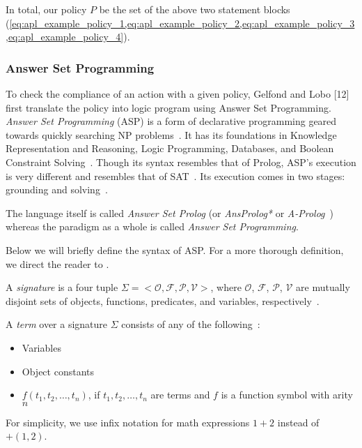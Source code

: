 In total, our policy $P$ be the set of the above two statement blocks (\cref{eq:apl_example_policy_1,eq:apl_example_policy_2,eq:apl_example_policy_3,eq:apl_example_policy_4}).

\subsubsection{Answer Set Programming}
\label{subsubsec:asp}

To check the compliance of an action with a given policy, Gelfond and Lobo [12] first translate the policy into logic program using Answer Set Programming.
\textit{Answer Set Programming} (ASP) is a form of declarative programming geared towards quickly searching NP problems~\citep{vladimir_lifschitz_what_2008}.
It has its foundations in Knowledge Representation and Reasoning, Logic Programming, Databases, and Boolean Constraint Solving~\citep{gebser_potassco_2011}.
Though its syntax resembles that of Prolog, ASP's execution is very different and resembles that of SAT~\citep{gebser_potassco_2011,vladimir_lifschitz_what_2008}.
Its execution comes in two stages: grounding and solving~\citep{gebser_potassco_2011}.

The language itself is called \textit{Answer Set Prolog} (or \textit{AnsProlog*} or \textit{A-Prolog}~\citep{baral_answer_2004}) whereas the paradigm as a whole is called \textit{Answer Set Programming}.


Below we will briefly define the syntax of ASP.
For a more thorough definition, we direct the reader to \citet{calimeri_asp-core-2_2020,gebser_abstract_2015}.

\begin{definition}
    A \textit{signature} is a four tuple $\Sigma = <\mathcal{O}, \mathcal{F}, \mathcal{P}, \mathcal{V}>$, where $\mathcal{O}$, $\mathcal{F}$, $\mathcal{P}$, $\mathcal{V}$ are mutually disjoint sets of objects, functions, predicates, and variables, respectively~\citep{blount_architecture_2013}.
\end{definition}

\begin{definition}
    A \textit{term} over a signature $\Sigma$ consists of any of the following~\citep{blount_architecture_2013}:
    \begin{itemize}
        \item Variables
        \item Object constants
        \item $f(t_1, t_2, \dots, t_n)$, if $t_1, t_2, \dots, t_n$ are terms and $f$ is a function symbol with arity $n$
    \end{itemize}
    For simplicity, we use infix notation for math expressions $1+2$ instead of $+(1, 2)$.
\end{definition}

